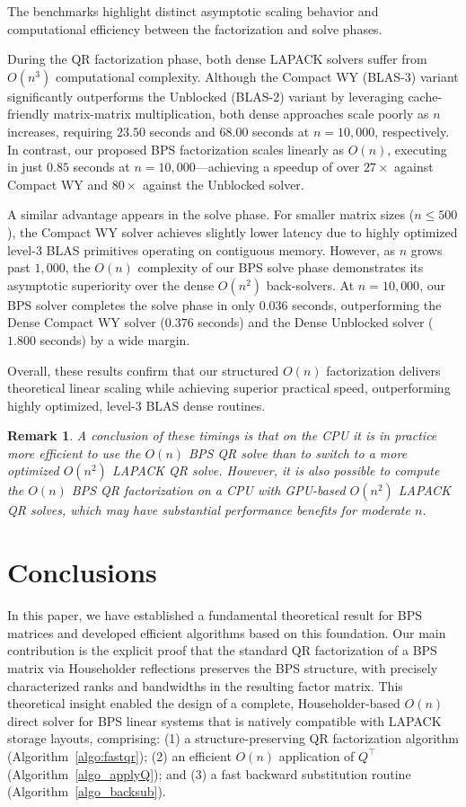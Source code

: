 \documentclass[a4paper,fleqn]{cas-sc}
\newtheorem{remark}{Remark}[section]
\begin{document}
The benchmarks highlight distinct asymptotic scaling behavior and computational efficiency between the factorization and solve phases. 

During the QR factorization phase, both dense LAPACK solvers suffer from $O(n^3)$ computational complexity. Although the Compact WY (BLAS-3) variant significantly outperforms the Unblocked (BLAS-2) variant by leveraging cache-friendly matrix-matrix multiplication, both dense approaches scale poorly as $n$ increases, requiring $23.50$ seconds and $68.00$ seconds at $n = 10,000$, respectively. In contrast, our proposed BPS factorization scales linearly as $O(n)$, executing in just $0.85$ seconds at $n = 10,000$---achieving a speedup of over $27\times$ against Compact WY and $80\times$ against the Unblocked solver.

A similar advantage appears in the solve phase. For smaller matrix sizes ($n \le 500$), the Compact WY solver achieves slightly lower latency due to highly optimized level-3 BLAS primitives operating on contiguous memory. However, as $n$ grows past $1,000$, the $O(n)$ complexity of our BPS solve phase demonstrates its asymptotic superiority over the dense $O(n^2)$ back-solvers. At $n = 10,\!000$, our BPS solver completes the solve phase in only $0.036$ seconds, outperforming the Dense Compact WY solver ($0.376$ seconds) and the Dense Unblocked solver ($1.800$ seconds) by a wide margin. 

Overall, these results confirm that our structured $O(n)$ factorization delivers theoretical linear scaling while achieving superior practical speed, outperforming highly optimized, level-3 BLAS dense routines. 

\begin{remark}
A conclusion of these timings is that on the CPU it is in practice more efficient to use the $O(n)$ BPS QR solve than to switch to a more optimized $O(n^2)$ LAPACK QR solve. However, it is also possible to compute the $O(n)$ BPS QR factorization on a CPU with GPU-based $O(n^2)$ LAPACK QR solves, which may have substantial performance benefits for moderate $n$.
\end{remark}

\section{Conclusions}
\label{sec:conclusions}

In this paper, we have established a fundamental theoretical result for BPS matrices and developed efficient algorithms based on this foundation. Our main contribution is the explicit proof that the standard QR factorization of a BPS matrix via Householder reflections preserves the BPS structure, with precisely characterized ranks and bandwidths in the resulting factor matrix. This theoretical insight enabled the design of a complete, Householder-based $O(n)$ direct solver for BPS linear systems that is natively compatible with LAPACK storage layouts, comprising: (1) a structure-preserving QR factorization algorithm (Algorithm~\ref{algo:fastqr}); (2) an efficient $O(n)$ application of $Q^\top$ (Algorithm~\ref{algo_applyQ}); and (3) a fast backward substitution routine (Algorithm~\ref{algo_backsub}).
\end{document}
